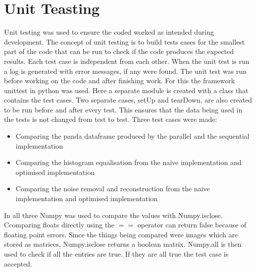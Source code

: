 \section{Unit Teasting}
Unit testing was used to ensure the coded worked as intended during development. The concept of unit testing is to build tests cases for the smallest part of the code that can be run to check if the code produces the expected results. Each test case is independent from each other.  When the unit test is run a log is generated with error messages, if any were found. The unit test was run before working on the code and after finishing work.  For this the framework unittest in python was used.  Here a separate module is created with a class that contains the test cases. Two separate cases, setUp and tearDown, are also created to be run before and after every test. This ensures that the data being used in the tests is not changed from test to test. Three test cases were made:
\begin{itemize}
\item Comparing the panda dataframe produced by the parallel and the sequential implementation
\item Comparing the histogram equalisation from the naive implementation and optimised implementation
\item Comparing the noise removal and reconstruction from the naive implementation and optimised implementation
\end{itemize}
\noindent
In all three Numpy was used to compare the values with Numpy.isclose. Ccomparing floats directly using the  $==$ operator can return false because of floating point errors. Since the things being compared were images which are stored as matrices, Numpy.isclose returns a boolean matrix. Numpy.all is then used to check if all the entries are true. If they are all true the test case is accepted.